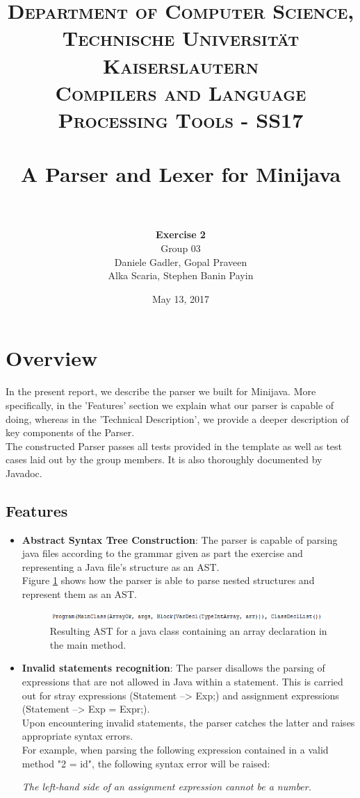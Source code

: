 \documentclass[paper=a4, fontsize=11pt]{scrartcl}
\title{
		\usefont{OT1}{bch}{b}{n}
		\normalfont \normalsize \textsc{Department of Computer Science, Technische Universit\"at Kaiserslautern\\
Compilers and Language Processing Tools - SS17
		} \\ [2pt]
		\horrule{0.5pt} \\[0.4cm]
		\huge A Parser and Lexer for Minijava\\
		\horrule{2pt} \\[0.5cm]
}
\author{	
		\textbf{Exercise 2}\\
		Group 03\\
        Daniele Gadler, Gopal Praveen\\Alka Scaria, Stephen Banin Payin \\[-1pt]		\normalsize
}
\date{May 13, 2017}
\numberwithin{equation}{section}		%
\numberwithin{figure}{section}			%
\numberwithin{table}{section}				%
\begin{document}
\maketitle

\section*{Overview}
In the present report, we describe the parser we built for Minijava. More specifically, in the 'Features' section we explain what our parser is capable of doing, whereas in the 'Technical Description', we provide a deeper description of key components of the Parser.\\
 The constructed Parser passes all tests provided in the template as well as test cases laid out by the group members. It is also thoroughly documented by Javadoc. 
\subsection*{Features}

\begin{itemize}
	\item \textbf{Abstract Syntax Tree Construction}: The parser is capable of parsing java files according to the grammar given as part the exercise and representing a Java file's structure as an AST. \\
Figure \ref{classPic} shows how the parser is able to parse nested structures and represent them as an AST.

\begin{figure}[h]
	 \includegraphics[scale=1]{class.png}
	 \caption{Resulting AST for a java class containing an array declaration in the main method.}
	 \label{classPic}
\end{figure}

	\item \textbf{Invalid statements recognition}:  The parser disallows the parsing of expressions that are not allowed in Java within a statement. This is carried out for stray expressions (Statement --> Exp;) and assignment expressions (Statement --> Exp = Expr;).\\
	 Upon encountering invalid statements, the parser catches the latter and raises appropriate syntax errors.\\ For example, when parsing the following expression contained in a valid method "2 = id", the following syntax error will be raised:
	 
	\textit{The left-hand side of an assignment expression cannot be a number.}

\end{itemize}
\end{document}
